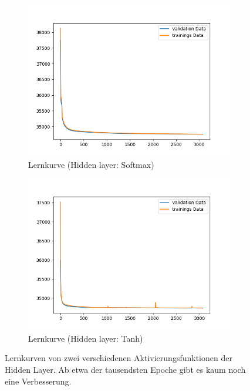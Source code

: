 \begin{figure}[ht]
\centering
\begin{subfigure}{0.5\textwidth}
\centering
\includegraphics[width=\linewidth]{pics/lernkurve_activationHidden-softmax_activationOutput-softmax}
\caption{Lernkurve (Hidden layer: Softmax)}
\label{fig:lernkurveSoftmax}
\end{subfigure}%
\begin{subfigure}{0.5\textwidth}
\centering
\includegraphics[width=\linewidth]{pics/lernkurve_activationHidden-tanh_activationOutput-softmax}
\caption{Lernkurve (Hidden layer: Tanh)}
\label{fig:lernkurveTanh}
\end{subfigure}%
\caption[Lernkurven verschiedener Aktivierungsfkt. der Hidden Layer]{Lernkurven von zwei verschiedenen Aktivierungsfunktionen der Hidden Layer. Ab etwa der tausendsten Epoche gibt es kaum noch eine Verbesserung.}
\label{fig:lernkurven}
\end{figure}



